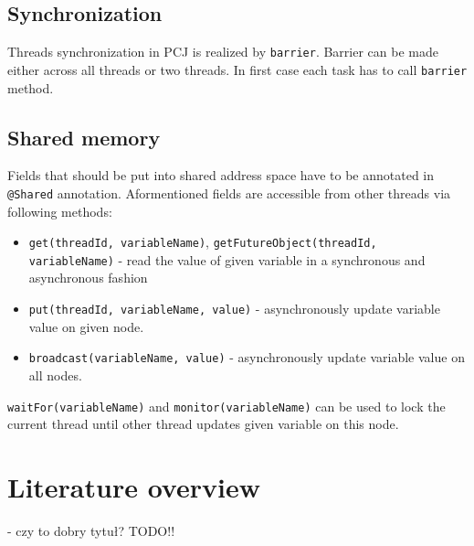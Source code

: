 \documentclass{llncs}
\newcommand{\inlinecode}{\texttt}
\begin{document}
\subsection{Synchronization}
Threads synchronization in PCJ is realized by \inlinecode{barrier}.
Barrier can be made either across all threads or two threads.
In first case each task has to call \inlinecode{barrier} method.
\subsection{Shared memory}
Fields that should be put into shared address space have to be annotated in \inlinecode{@Shared} annotation.
Aformentioned fields are accessible from other threads via following methods:
\begin{itemize}
\item\inlinecode{get(threadId, variableName)}, \inlinecode{getFutureObject(threadId, variableName)} - read the value of given variable
in a synchronous and asynchronous fashion
\item\inlinecode{put(threadId, variableName, value)} - asynchronously update variable value on given node.
\item\inlinecode{broadcast(variableName, value)} - asynchronously update variable value on all nodes.
\end{itemize}
\inlinecode{waitFor(variableName)} and \inlinecode{monitor(variableName)} can be used to lock the current thread until other thread updates given variable on this node.

\section{Literature overview}  - czy to dobry tytuł?
TODO!!
\end{document}
